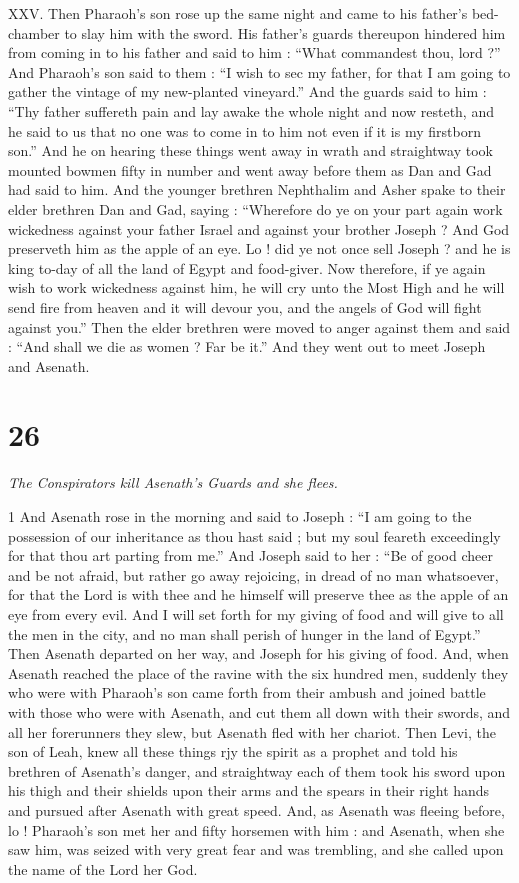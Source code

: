 XXV. Then Pharaoh's son rose up the same night and came to his father's bed-chamber to slay him with the sword. His father's guards thereupon hindered him from coming in to his father and said to him : “What commandest thou, lord ?” And Pharaoh's son said to them : “I wish to sec my father, for that I am going to gather the vintage of my new-planted vineyard.” And the guards said to him : “Thy father suffereth pain and lay awake the whole night and now resteth, and he said to us that no one was to come in to him not even if it is my firstborn son.” And he on hearing these things went away in wrath and straightway took mounted bowmen fifty in number and went away before them as Dan and Gad had said to him. And the younger brethren Nephthalim and Asher spake to their elder brethren Dan and Gad, saying : “Wherefore do ye on your part again work wickedness against your father Israel and against your brother Joseph ? And God preserveth him as the apple of an eye. Lo ! did ye not once sell Joseph ? and he is king to-day of all the land of Egypt and food-giver. Now therefore, if ye again wish to work wickedness against him, he will cry unto the Most High and he will send fire from heaven and it will devour you, and the angels of God will fight against you.” Then the elder brethren were moved to anger against them and said : “And shall we die as women ? Far be it.” And they went out to meet Joseph and Asenath. 

\chapter{26}

\par \textit{The Conspirators kill Asenath's Guards and she flees.}


1 And Asenath rose in the morning and said to Joseph : “I am going to the possession of our inheritance as thou hast said ; but my soul feareth exceedingly for that thou art parting from me.” And Joseph said to her : “Be of good cheer and be not afraid, but rather go away rejoicing, in dread of no man whatsoever, for that the Lord is with thee and he himself will preserve thee as the apple of an eye from every evil. And I will set forth for my giving of food and will give to all the men in the city, and no man shall perish of hunger in the land of Egypt.” Then Asenath departed on her way, and Joseph for his giving of food. And, when Asenath reached the place of the ravine with the six hundred men, suddenly they who were with Pharaoh's son came forth from their ambush and joined battle with those who were with Asenath, and cut them all down with their swords, and all her forerunners they slew, but Asenath fled with her chariot. Then Levi, the son of Leah, knew all these things rjy the spirit as a prophet and told his brethren of Asenath's danger, and straightway each of them took his sword upon his thigh and their shields upon their arms and the spears in their right hands and pursued after Asenath with great speed. And, as Asenath was fleeing before, lo ! Pharaoh's son met her and fifty horsemen with him : and Asenath, when she saw him, was seized with very great fear and was trembling, and she called upon the name of the Lord her God. 


